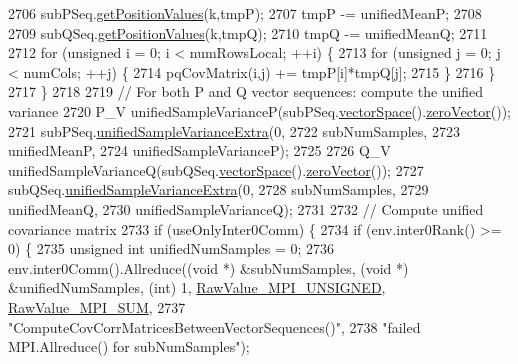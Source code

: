 \begin{DoxyCode}
2706     subPSeq.\hyperlink{class_q_u_e_s_o_1_1_base_vector_sequence_a656d47a18b401d6d914b0daf2dea88b0}{getPositionValues}(k,tmpP);
2707     tmpP -= unifiedMeanP;
2708 
2709     subQSeq.\hyperlink{class_q_u_e_s_o_1_1_base_vector_sequence_a656d47a18b401d6d914b0daf2dea88b0}{getPositionValues}(k,tmpQ);
2710     tmpQ -= unifiedMeanQ;
2711 
2712     \textcolor{keywordflow}{for} (\textcolor{keywordtype}{unsigned} i = 0; i < numRowsLocal; ++i) \{
2713       \textcolor{keywordflow}{for} (\textcolor{keywordtype}{unsigned} j = 0; j < numCols; ++j) \{
2714         pqCovMatrix(i,j) += tmpP[i]*tmpQ[j];
2715       \}
2716     \}
2717   \}
2718 
2719   \textcolor{comment}{// For both P and Q vector sequences: compute the unified variance}
2720   P\_V unifiedSampleVarianceP(subPSeq.\hyperlink{class_q_u_e_s_o_1_1_base_vector_sequence_af9a4dd979a2fa8dee85bb07793b59ba2}{vectorSpace}().\hyperlink{class_q_u_e_s_o_1_1_vector_space_a92e963bb5cab3eecd290dfe4b8f03b04}{zeroVector}());
2721   subPSeq.\hyperlink{class_q_u_e_s_o_1_1_base_vector_sequence_abc759076a4c5d9e1586a6d93629778ff}{unifiedSampleVarianceExtra}(0,
2722                                      subNumSamples,
2723                                      unifiedMeanP,
2724                                      unifiedSampleVarianceP);
2725 
2726   Q\_V unifiedSampleVarianceQ(subQSeq.\hyperlink{class_q_u_e_s_o_1_1_base_vector_sequence_af9a4dd979a2fa8dee85bb07793b59ba2}{vectorSpace}().\hyperlink{class_q_u_e_s_o_1_1_vector_space_a92e963bb5cab3eecd290dfe4b8f03b04}{zeroVector}());
2727   subQSeq.\hyperlink{class_q_u_e_s_o_1_1_base_vector_sequence_abc759076a4c5d9e1586a6d93629778ff}{unifiedSampleVarianceExtra}(0,
2728                                      subNumSamples,
2729                                      unifiedMeanQ,
2730                                      unifiedSampleVarianceQ);
2731 
2732   \textcolor{comment}{// Compute unified covariance matrix}
2733   \textcolor{keywordflow}{if} (useOnlyInter0Comm) \{
2734     \textcolor{keywordflow}{if} (env.inter0Rank() >= 0) \{
2735       \textcolor{keywordtype}{unsigned} \textcolor{keywordtype}{int} unifiedNumSamples = 0;
2736       env.inter0Comm().Allreduce((\textcolor{keywordtype}{void} *) &subNumSamples, (\textcolor{keywordtype}{void} *) &unifiedNumSamples, (\textcolor{keywordtype}{int}) 1, 
      \hyperlink{_mpi_comm_8h_a06cbfbc33436f6e0dc8a48ff3c49bdfc}{RawValue\_MPI\_UNSIGNED}, \hyperlink{_mpi_comm_8h_afbf78d291c032aa7f512bc566cee2bd1}{RawValue\_MPI\_SUM},
2737                                  \textcolor{stringliteral}{"ComputeCovCorrMatricesBetweenVectorSequences()"},
2738                                  \textcolor{stringliteral}{"failed MPI.Allreduce() for subNumSamples"});

\end{DoxyCode}
